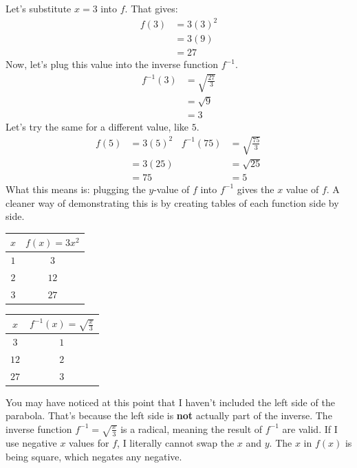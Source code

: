 Let's substitute $x = 3$ into $f$. That gives:
\begin{align*}
    f(3) &= 3(3)^2 \\
    &= 3(9) \\
    &= 27
\end{align*}
Now, let's plug this value into the inverse function $f^{-1}$.
\begin{align*}
    f^{-1}(3) &= \sqrt{\frac{27}{3}} \\
    &= \sqrt{9} \\
    &= 3
\end{align*}
Let's try the same for a different value, like $5$.
\begin{align*}
    f(5) &= 3(5)^2 & f^{-1}(75) &= \sqrt{\frac{75}{3}} \\
    &= 3(25) & &= \sqrt{25} \\
    &= 75 & &= 5
\end{align*}
What this means is: plugging the $y$-value of $f$ into $f^{-1}$ gives the $x$ value of $f$. A cleaner way of demonstrating this is by creating tables of each function side by side.
\begin{center}
    \begin{tabular}{ c | c }
        $x$ & $f(x) = 3x^2$ \\
        \hline
        $1$ & $3$ \\
        \hline
        $2$ & $12$ \\
        \hline
        $3$ & $27$
    \end{tabular}
    \quad
    \begin{tabular}{ c | c }
        $x$ & $f^{-1}(x) = \sqrt{\frac{x}{3}}$ \\
        \hline
        $3$ & $1$ \\
        \hline
        $12$ & $2$ \\
        \hline
        $27$ & $3$
    \end{tabular}
\end{center}
You may have noticed at this point that I haven't included the left side of the parabola. That's because the left side is \textbf{not} actually part of the inverse. The inverse function $f^{-1} = \sqrt{\frac{x}{3}}$ is a radical, meaning the result of $f^{-1}$ are valid. If I use negative $x$ values for $f$, I literally cannot swap the $x$ and $y$. The $x$ in $f(x)$ is being square, which negates any negative.
